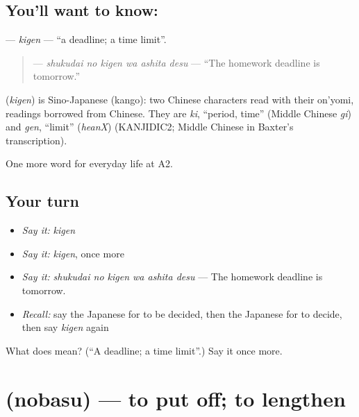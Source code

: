 \subsection*{You'll want to know: }
\textbf{} — \emph{kigen} — \textquotedblleft{}a deadline; a time limit\textquotedblright{}.

\begin{quote}
\textbf{  } — \emph{shukudai no kigen wa ashita desu} — \textquotedblleft{}The homework deadline is tomorrow.\textquotedblright{}
\end{quote}

\begin{cousinweb}
\textbf{} (\emph{kigen}) is Sino-Japanese (kango): two Chinese characters read with their on'yomi, readings borrowed from Chinese. They are \emph{ki}, \textquotedblleft{}period, time\textquotedblright{} (Middle Chinese \emph{gi}) and \emph{gen}, \textquotedblleft{}limit\textquotedblright{} (\emph{heanX}) (KANJIDIC2; Middle Chinese in Baxter's transcription).
\end{cousinweb}

\begin{grammarlens}[title={What you've built}]
One more word for everyday life at A2.
\end{grammarlens}

\subsection*{Your turn}
\begin{itemize}
\raggedright
  \item \emph{Say it:} \emph{kigen}
  \item \emph{Say it:} \emph{kigen}, once more
  \item \emph{Say it:} \emph{shukudai no kigen wa ashita desu} — The homework deadline is tomorrow.
  \item \emph{Recall:} say the Japanese for to be decided, then the Japanese for to decide, then say \emph{kigen} again
\end{itemize}

\begin{tcolorbox}[breakable,colback=teal!4,colframe=teal!35!black,title={Before you move on}]
What does  mean? (\textquotedblleft{}A deadline; a time limit\textquotedblright{}.) Say it once more.
\end{tcolorbox}
\section[\texorpdfstring{\ja{のばす} (nobasu)}{のばす (nobasu)}]{ (nobasu) — to put off; to lengthen}

